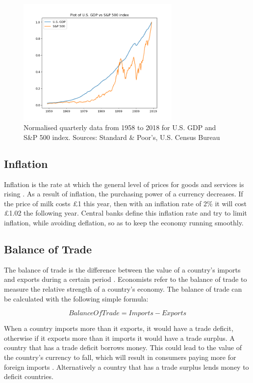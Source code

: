 \documentclass{UoYCSproject}
\begin{document}
\begin{figure}[h]
\includegraphics[width=8cm]{GDPvsSP500}
\centering
\caption{Normalised quarterly data from 1958 to 2018 for U.S. GDP and S\&P 500 index. Sources: Standard \& Poor's, U.S. Census Bureau} 
\label{fig:gdpvssp500}
\end{figure}

\subsection{Inflation}
Inflation is the rate at which the general level of prices for goods and services is rising \cite{inflation}. As a result of inflation, the purchasing power of a currency decreases. If the price of milk costs \pounds 1 this year, then with an inflation rate of 2\% it will cost \pounds 1.02 the following year. Central banks define this inflation rate and try to limit inflation, while avoiding deflation, so as to keep the economy running smoothly.    

\subsection{Balance of Trade}
The balance of trade is the difference between the value of a country's imports and exports during a certain period \cite{balanceoftrade}. Economists refer to the balance of trade to measure the relative strength of a country's economy. The balance of trade can be calculated with the following simple formula:

\begin{equation}
    Balance Of Trade = Imports - Exports
\end{equation}

When a country imports more than it exports, it would have a trade deficit, otherwise if it exports more than it imports it would have a trade surplus. A country that has a trade deficit borrows money. This could lead to the value of the country's currency to fall, which will result in consumers paying more for foreign imports \cite{2003economics}. Alternatively a country that has a trade surplus lends money to deficit countries.    
\end{document}
